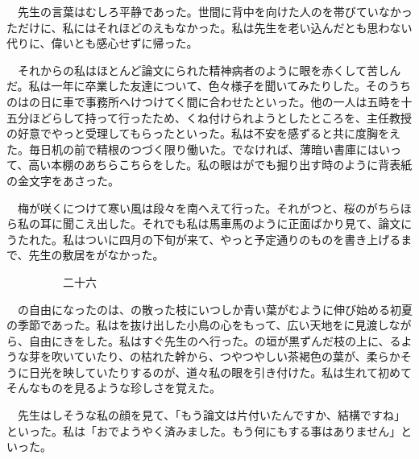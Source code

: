 \documentclass[a4j,onecolumn]{tarticle}
\begin{document}
　先生の言葉はむしろ平静であった。\hbox{}世間に背中を向けた人のを帯びていなかっただけに、\hbox{}私にはそれほどのえもなかった。\hbox{}私は先生を老い込んだとも思わない代りに、\hbox{}偉いとも感心せずに帰った。\hbox{}\par{}
　それからの私はほとんど論文にられた精神病者のように眼を赤くして苦しんだ。\hbox{}私は一年に卒業した友達について、\hbox{}色々様子を聞いてみたりした。\hbox{}そのうちのはの日に車で事務所へけつけてく間に合わせたといった。\hbox{}他の一人は五時を十五分ほどらして持って行ったため、\hbox{}くね付けられようとしたところを、\hbox{}主任教授の好意でやっと受理してもらったといった。\hbox{}私は不安を感ずると共に度胸をえた。\hbox{}毎日机の前で精根のつづく限り働いた。\hbox{}でなければ、\hbox{}薄暗い書庫にはいって、\hbox{}高い本棚のあちらこちらをした。\hbox{}私の眼はがでも掘り出す時のように背表紙の金文字をあさった。\hbox{}\par{}
　梅が咲くにつけて寒い風は段々を南へえて行った。\hbox{}それがつと、\hbox{}桜のがちらほら私の耳に聞こえ出した。\hbox{}それでも私は馬車馬のように正面ばかり見て、\hbox{}論文にうたれた。\hbox{}私はついに四月の下旬が来て、\hbox{}やっと予定通りのものを書き上げるまで、\hbox{}先生の敷居をがなかった。\hbox{}\par{}\par{}　　　　　二十六
\par{}
　の自由になったのは、\hbox{}の散った枝にいつしか青い葉がむように伸び始める初夏の季節であった。\hbox{}私はを抜け出した小鳥の心をもって、\hbox{}広い天地をに見渡しながら、\hbox{}自由にきをした。\hbox{}私はすぐ先生のへ行った。\hbox{}の垣が黒ずんだ枝の上に、\hbox{}るような芽を吹いていたり、\hbox{}の枯れた幹から、\hbox{}つやつやしい茶褐色の葉が、\hbox{}柔らかそうに日光を映していたりするのが、\hbox{}道々私の眼を引き付けた。\hbox{}私は生れて初めてそんなものを見るような珍しさを覚えた。\hbox{}\par{}
　先生はしそうな私の顔を見て、\hbox{}「もう論文は片付いたんですか、\hbox{}結構ですね」といった。\hbox{}私は「おでようやく済みました。\hbox{}もう何にもする事はありません」といった。\hbox{}\par{}
\end{document}
